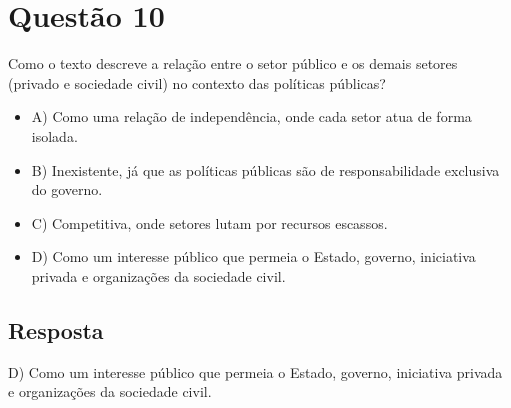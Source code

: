 \documentclass[
   article,       
   12pt,          
   oneside,       
   a4paper,       
   english,       
   brazil,        
   sumario=tradicional
   ]{abntex2}
\begin{document}
\section{Questão 10}
Como o texto descreve a relação entre o setor público e os demais setores (privado e sociedade civil) no contexto das políticas públicas?
\begin{itemize}
    \item {A) Como uma relação de independência, onde cada setor atua de forma isolada.}
    \item {B) Inexistente, já que as políticas públicas são de responsabilidade exclusiva do governo.}
    \item {C) Competitiva, onde setores lutam por recursos escassos.}
    \item {D) Como um interesse público que permeia o Estado, governo, iniciativa privada e organizações da sociedade civil.}
\end{itemize}

\subsection{Resposta}
D) Como um interesse público que permeia o Estado, governo, iniciativa privada e organizações da sociedade civil.
\postextual

\end{document}
